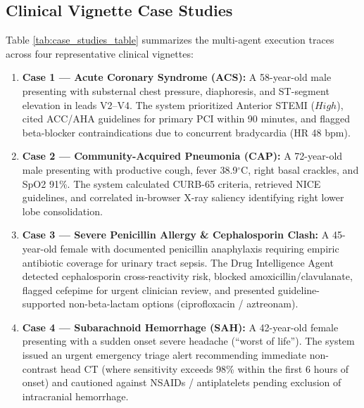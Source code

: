 \documentclass[journal,10pt,twocolumn]{IEEEtran}
\begin{document}
\subsection{Clinical Vignette Case Studies}
Table \ref{tab:case_studies_table} summarizes the multi-agent execution traces across four representative clinical vignettes:
\begin{enumerate}
    \item \textbf{Case 1 --- Acute Coronary Syndrome (ACS):} A 58-year-old male presenting with substernal chest pressure, diaphoresis, and ST-segment elevation in leads V2--V4. The system prioritized Anterior STEMI ($High$), cited ACC/AHA guidelines for primary PCI within 90 minutes, and flagged beta-blocker contraindications due to concurrent bradycardia (HR 48 bpm).
    \item \textbf{Case 2 --- Community-Acquired Pneumonia (CAP):} A 72-year-old male presenting with productive cough, fever 38.9$^\circ$C, right basal crackles, and SpO2 91\%. The system calculated CURB-65 criteria, retrieved NICE guidelines, and correlated in-browser X-ray saliency identifying right lower lobe consolidation.
    \item \textbf{Case 3 --- Severe Penicillin Allergy \& Cephalosporin Clash:} A 45-year-old female with documented penicillin anaphylaxis requiring empiric antibiotic coverage for urinary tract sepsis. The Drug Intelligence Agent detected cephalosporin cross-reactivity risk, blocked amoxicillin/clavulanate, flagged cefepime for urgent clinician review, and presented guideline-supported non-beta-lactam options (ciprofloxacin / aztreonam).
    \item \textbf{Case 4 --- Subarachnoid Hemorrhage (SAH):} A 42-year-old female presenting with a sudden onset severe headache (``worst of life''). The system issued an urgent emergency triage alert recommending immediate non-contrast head CT (where sensitivity exceeds 98\% within the first 6 hours of onset) and cautioned against NSAIDs / antiplatelets pending exclusion of intracranial hemorrhage.
\end{enumerate}
\end{document}
